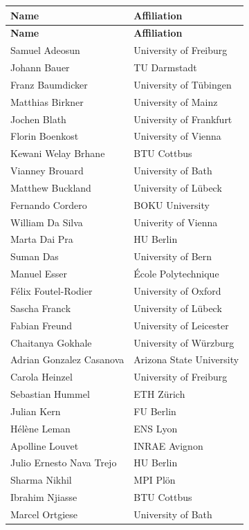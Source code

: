 \documentclass[12pt,a4paper]{article}
\begin{document}
\begin{longtable}{L{0.3\textwidth}R{0.7\textwidth}}
\hline
\textbf{Name} & \textbf{Affiliation} \\
\hline
\endfirsthead

\hline
\textbf{Name} & \textbf{Affiliation} \\
\hline
\endhead

Samuel Adeosun & University of Freiburg \\
Johann Bauer & TU Darmstadt \\
Franz Baumdicker & University of Tübingen \\
Matthias Birkner & University of Mainz \\
Jochen Blath & University of Frankfurt \\
Florin Boenkost & University of Vienna \\
Kewani Welay Brhane & BTU Cottbus \\
Vianney Brouard & University of Bath \\
Matthew Buckland & University of Lübeck \\
Fernando Cordero & BOKU University \\
William Da Silva & Univerity of Vienna \\
Marta Dai Pra & HU Berlin \\
Suman Das & University of Bern \\
Manuel Esser & École Polytechnique \\
Félix Foutel-Rodier & University of Oxford \\
Sascha Franck & University of Lübeck \\
Fabian Freund & University of Leicester \\
Chaitanya Gokhale & University of Würzburg \\
Adrian Gonzalez Casanova & Arizona State University \\
Carola Heinzel & University of Freiburg \\
Sebastian Hummel & ETH Zürich \\
Julian Kern & FU Berlin \\
Hélène Leman & ENS Lyon \\
Apolline Louvet & INRAE Avignon \\
Julio Ernesto Nava Trejo & HU Berlin \\
Sharma Nikhil & MPI Plön \\
Ibrahim Njiasse & BTU Cottbus \\
Marcel Ortgiese & University of Bath \\

\end{longtable}
\end{document}
